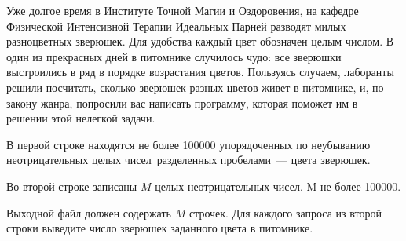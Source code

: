 Уже долгое время в Институте Точной Магии и Оздоровения, на кафедре Физической Интенсивной Терапии Идеальных Парней разводят милых разноцветных зверюшек. 
Для удобства каждый цвет обозначен целым числом. 
В один из прекрасных дней в питомнике случилось чудо: все зверюшки выстроились в ряд в порядке возрастания цветов. 
Пользуясь случаем, лаборанты решили посчитать, сколько зверюшек разных цветов живет в питомнике, и, по закону жанра, попросили вас написать программу, которая поможет им в решении этой нелегкой задачи.


\InputFile
В первой строке находятся не более 100000 упорядоченных по неубыванию неотрицательных 
целых чисел~разделенных пробелами~--- цвета зверюшек. 

Во второй строке записаны $M$ целых неотрицательных чисел. M не более 100000.


\OutputFile
Выходной файл должен содержать $M$ строчек. 
Для каждого запроса из второй строки выведите число зверюшек заданного цвета в питомнике.
